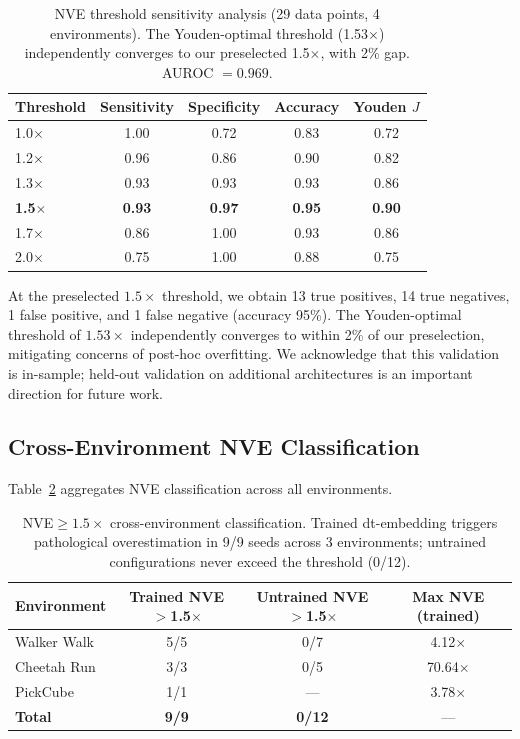 \documentclass[10pt,letterpaper]{article}
\begin{document}
\begin{table}[h]
\centering
\caption{NVE threshold sensitivity analysis (29 data points, 4 environments). The Youden-optimal threshold (1.53$\times$) independently converges to our preselected 1.5$\times$, with 2\% gap.
AUROC $= 0.969$.}
\label{tab:nve_auroc}
\small
\begin{tabular}{lcccc}
\toprule
Threshold & Sensitivity & Specificity & Accuracy & Youden $J$ \\
\midrule
1.0$\times$ & 1.00 & 0.72 & 0.83 & 0.72 \\
1.2$\times$ & 0.96 & 0.86 & 0.90 & 0.82 \\
1.3$\times$ & 0.93 & 0.93 & 0.93 & 0.86 \\
\textbf{1.5$\times$} & \textbf{0.93} & \textbf{0.97} & \textbf{0.95} & \textbf{0.90} \\
1.7$\times$ & 0.86 & 1.00 & 0.93 & 0.86 \\
2.0$\times$ & 0.75 & 1.00 & 0.88 & 0.75 \\
\bottomrule
\end{tabular}
\end{table}

At the preselected $1.5\times$ threshold, we obtain 13 true positives, 14 true negatives, 1 false positive, and 1 false negative (accuracy 95\%).
The Youden-optimal threshold of $1.53\times$ independently converges to within 2\% of our preselection, mitigating concerns of post-hoc overfitting.
We acknowledge that this validation is in-sample; held-out validation on additional architectures is an important direction for future work.

\subsection{Cross-Environment NVE Classification}

Table~\ref{tab:nve_cross_env} aggregates NVE classification across all environments.

\begin{table}[h]
\centering
\caption{NVE$\geq 1.5\times$ cross-environment classification. Trained dt-embedding triggers pathological overestimation in 9/9 seeds across 3 environments; untrained configurations never exceed the threshold (0/12).}
\label{tab:nve_cross_env}
\small
\begin{tabular}{lccc}
\toprule
Environment & Trained NVE$>$1.5$\times$ & Untrained NVE$>$1.5$\times$ & Max NVE (trained) \\
\midrule
Walker Walk & 5/5 & 0/7 & 4.12$\times$ \\
Cheetah Run & 3/3 & 0/5 & 70.64$\times$ \\
PickCube & 1/1 & --- & 3.78$\times$ \\
\textbf{Total} & \textbf{9/9} & \textbf{0/12} & --- \\
\bottomrule
\end{tabular}
\end{table}
\end{document}
